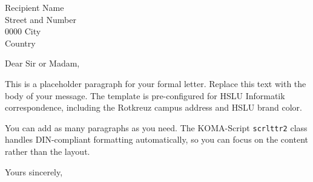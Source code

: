 \documentclass[a4paper, fromalign=left, fromphone=true, fromemail=true]{scrlttr2}
\begin{document}
\begin{letter}{Recipient Name \\ Street and Number \\ 0000 City \\ Country}

\opening{Dear Sir or Madam,}

This is a placeholder paragraph for your formal letter. Replace this text with
the body of your message. The template is pre-configured for HSLU Informatik
correspondence, including the Rotkreuz campus address and HSLU brand color.

You can add as many paragraphs as you need. The KOMA-Script \texttt{scrlttr2}
class handles DIN-compliant formatting automatically, so you can focus on the
content rather than the layout.

\closing{Yours sincerely,}

\end{letter}
\end{document}
